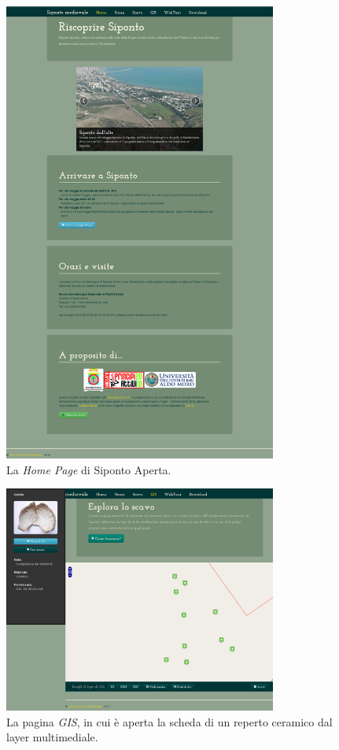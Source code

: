 \documentclass{paper}
\begin{document}
    \begin{figure}
        \centering
        \includegraphics[width=0.8\textwidth]{img/home}
        \caption[\textit{Home page} di Siponto Aperta]{La \textit{Home Page} di Siponto Aperta.}
        \label{fig:home}
    \end{figure}

    \begin{figure}
        \centering
        \includegraphics[width=0.8\textwidth]{img/gis}
        \caption[La pagina \emph{GIS}]{La pagina \emph{GIS}, in cui è aperta la scheda di un reperto ceramico dal layer multimediale.}
        \label{fig:gis}
    \end{figure}


\printbibliography
\end{document}
